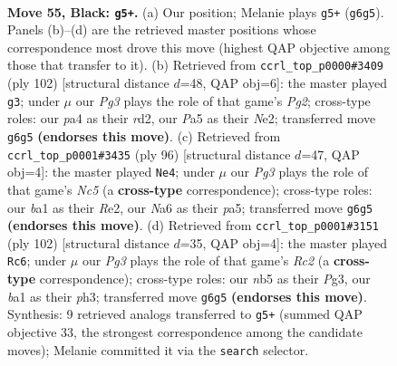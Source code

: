 \documentclass[11pt]{article}
\begin{document}
\clearpage

\begin{figure}[p]\centering
\begin{subfigure}{0.46\textwidth}\centering
\resizebox{\linewidth}{!}{%
\newchessgame
\chessboard[
  setfen={8/4p1k1/npr3pp/pN6/P1p2K2/2P2P2/3R4/B7 b - - 5 55},
  showmover=false,
  pgfstyle=straightmove, color=movearrow, markmove={g6-g5}
]}
\caption{}
\end{subfigure}\hfill
\begin{subfigure}{0.46\textwidth}\centering
\resizebox{\linewidth}{!}{%
\newchessgame
\chessboard[
  setfen={8/5R2/6pk/4p2p/4P3/2Pn1P1P/3rN1P1/5K2 w - - 1 52},
  showmover=false,
  pgfstyle=straightmove, color=movearrow, markmove={g2-g3}
]}
\caption{}
\end{subfigure}
\\[4pt]
\begin{subfigure}{0.46\textwidth}\centering
\resizebox{\linewidth}{!}{%
\newchessgame
\chessboard[
  setfen={8/8/6pb/p1Nr1k1p/7P/6P1/P3RPK1/8 w - - 4 49},
  showmover=false,
  pgfstyle=straightmove, color=movearrow, markmove={c5-e4}
]}
\caption{}
\end{subfigure}\hfill
\begin{subfigure}{0.46\textwidth}\centering
\resizebox{\linewidth}{!}{%
\newchessgame
\chessboard[
  setfen={7r/1N6/1n3p2/1P1kpp2/p7/5PPp/P1R2K1P/8 w - - 1 52},
  showmover=false,
  pgfstyle=straightmove, color=movearrow, markmove={c2-c6}
]}
\caption{}
\end{subfigure}
\caption{\textbf{Move 55, Black: \texttt{g5+}.} (a) Our position; Melanie plays \texttt{g5+} (\texttt{g6g5}). Panels (b)--(d) are the retrieved master positions whose correspondence most drove this move (highest QAP objective among those that transfer to it). (b) Retrieved from \texttt{ccrl\_top\_p0000\#3409} (ply 102) [structural distance $d$=48, QAP obj=6]: the master played \texttt{g3}; under $\mu$ our \emph{Pg3} plays the role of that game's \emph{Pg2}; cross-type roles: our \emph{p}a4 as their \emph{r}d2, our \emph{P}a5 as their \emph{N}e2; transferred move \texttt{g6g5} \textbf{(endorses this move)}. (c) Retrieved from \texttt{ccrl\_top\_p0001\#3435} (ply 96) [structural distance $d$=47, QAP obj=4]: the master played \texttt{Ne4}; under $\mu$ our \emph{Pg3} plays the role of that game's \emph{Nc5} (a \textbf{cross-type} correspondence); cross-type roles: our \emph{b}a1 as their \emph{R}e2, our \emph{N}a6 as their \emph{p}a5; transferred move \texttt{g6g5} \textbf{(endorses this move)}. (d) Retrieved from \texttt{ccrl\_top\_p0001\#3151} (ply 102) [structural distance $d$=35, QAP obj=4]: the master played \texttt{Rc6}; under $\mu$ our \emph{Pg3} plays the role of that game's \emph{Rc2} (a \textbf{cross-type} correspondence); cross-type roles: our \emph{n}b5 as their \emph{P}g3, our \emph{b}a1 as their \emph{p}h3; transferred move \texttt{g6g5} \textbf{(endorses this move)}. Synthesis: 9 retrieved analogs transferred to \texttt{g5+} (summed QAP objective 33, the strongest correspondence among the candidate moves); Melanie committed it via the \texttt{search} selector.}
\label{fig:thought-m109}
\end{figure}
\end{document}
